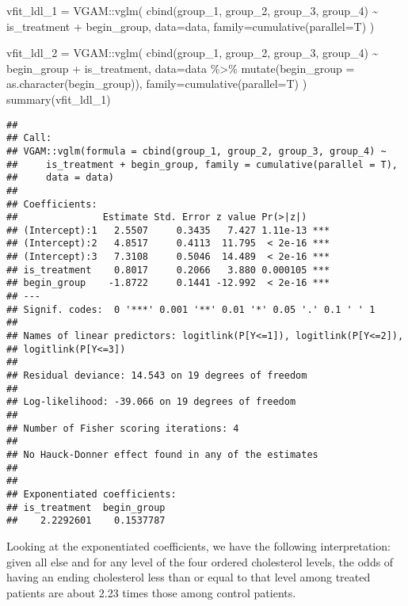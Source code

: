 \documentclass[
]{article}
\newenvironment{Shaded}{\begin{snugshade}}{\end{snugshade}}
\newcommand{\AttributeTok}[1]{\textcolor[rgb]{0.77,0.63,0.00}{#1}}
\newcommand{\FunctionTok}[1]{\textcolor[rgb]{0.00,0.00,0.00}{#1}}
\newcommand{\NormalTok}[1]{#1}
\newcommand{\OtherTok}[1]{\textcolor[rgb]{0.56,0.35,0.01}{#1}}
\newcommand{\SpecialCharTok}[1]{\textcolor[rgb]{0.00,0.00,0.00}{#1}}
\begin{document}
\begin{Shaded}
\begin{Highlighting}[]
\NormalTok{vfit\_ldl\_1 }\OtherTok{=}\NormalTok{ VGAM}\SpecialCharTok{::}\FunctionTok{vglm}\NormalTok{(}
  \FunctionTok{cbind}\NormalTok{(group\_1, group\_2, group\_3, group\_4) }\SpecialCharTok{\textasciitilde{}}\NormalTok{ is\_treatment }\SpecialCharTok{+}\NormalTok{ begin\_group,}
  \AttributeTok{data=}\NormalTok{data,}
  \AttributeTok{family=}\FunctionTok{cumulative}\NormalTok{(}\AttributeTok{parallel=}\NormalTok{T)}
\NormalTok{)}

\NormalTok{vfit\_ldl\_2 }\OtherTok{=}\NormalTok{ VGAM}\SpecialCharTok{::}\FunctionTok{vglm}\NormalTok{(}
  \FunctionTok{cbind}\NormalTok{(group\_1, group\_2, group\_3, group\_4) }\SpecialCharTok{\textasciitilde{}}\NormalTok{ begin\_group }\SpecialCharTok{+}\NormalTok{ is\_treatment,}
  \AttributeTok{data=}\NormalTok{data }\SpecialCharTok{\%\textgreater{}\%} \FunctionTok{mutate}\NormalTok{(}\AttributeTok{begin\_group =} \FunctionTok{as.character}\NormalTok{(begin\_group)),}
  \AttributeTok{family=}\FunctionTok{cumulative}\NormalTok{(}\AttributeTok{parallel=}\NormalTok{T)}
\NormalTok{)}
\FunctionTok{summary}\NormalTok{(vfit\_ldl\_1)}
\end{Highlighting}
\end{Shaded}

\begin{verbatim}
## 
## Call:
## VGAM::vglm(formula = cbind(group_1, group_2, group_3, group_4) ~ 
##     is_treatment + begin_group, family = cumulative(parallel = T), 
##     data = data)
## 
## Coefficients: 
##               Estimate Std. Error z value Pr(>|z|)    
## (Intercept):1   2.5507     0.3435   7.427 1.11e-13 ***
## (Intercept):2   4.8517     0.4113  11.795  < 2e-16 ***
## (Intercept):3   7.3108     0.5046  14.489  < 2e-16 ***
## is_treatment    0.8017     0.2066   3.880 0.000105 ***
## begin_group    -1.8722     0.1441 -12.992  < 2e-16 ***
## ---
## Signif. codes:  0 '***' 0.001 '**' 0.01 '*' 0.05 '.' 0.1 ' ' 1
## 
## Names of linear predictors: logitlink(P[Y<=1]), logitlink(P[Y<=2]), 
## logitlink(P[Y<=3])
## 
## Residual deviance: 14.543 on 19 degrees of freedom
## 
## Log-likelihood: -39.066 on 19 degrees of freedom
## 
## Number of Fisher scoring iterations: 4 
## 
## No Hauck-Donner effect found in any of the estimates
## 
## 
## Exponentiated coefficients:
## is_treatment  begin_group 
##    2.2292601    0.1537787
\end{verbatim}

Looking at the exponentiated coefficients, we have the following
interpretation: given all else and for any level of the four ordered
cholesterol levels, the odds of having an ending cholesterol less than
or equal to that level among treated patients are about 2.23 times those
among control patients.
\end{document}
